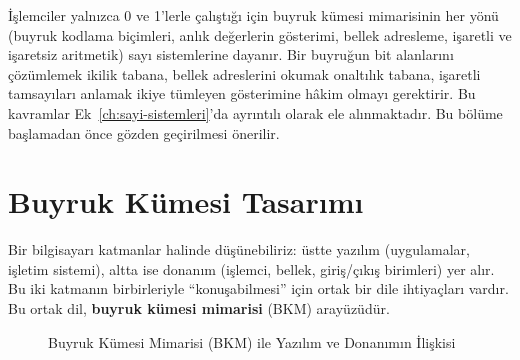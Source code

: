 \begin{bilginot}
İşlemciler yalnızca 0 ve 1'lerle çalıştığı için buyruk kümesi mimarisinin her yönü (buyruk kodlama biçimleri, anlık değerlerin gösterimi, bellek adresleme, işaretli ve işaretsiz aritmetik) sayı sistemlerine dayanır. Bir buyruğun bit alanlarını çözümlemek ikilik tabana, bellek adreslerini okumak onaltılık tabana, işaretli tamsayıları anlamak ikiye tümleyen gösterimine hâkim olmayı gerektirir. Bu kavramlar Ek~\ref{ch:sayi-sistemleri}'da ayrıntılı olarak ele alınmaktadır. Bu bölüme başlamadan önce gözden geçirilmesi önerilir.
\end{bilginot}


\section{Buyruk Kümesi Tasarımı}
\label{sec:bkm-tasarimi}

Bir bilgisayarı katmanlar halinde düşünebiliriz: üstte yazılım (uygulamalar, işletim sistemi), altta ise donanım (işlemci, bellek, giriş/çıkış birimleri) yer alır. Bu iki katmanın birbirleriyle ``konuşabilmesi'' için ortak bir dile ihtiyaçları vardır. Bu ortak dil, \textbf{buyruk kümesi mimarisi} (BKM) arayüzüdür.

\begin{figure}[H]
\centering
{}
\caption{Buyruk Kümesi Mimarisi (BKM) ile Yazılım ve Donanımın İlişkisi}
\label{fig:bkm-iliskisi}
\end{figure}

